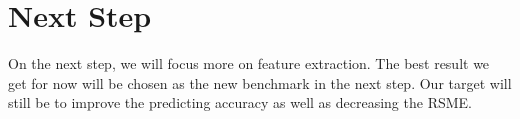\documentclass{article} %
\begin{document}

\section{Next Step}
On the next step, we will focus more on feature extraction. The best result we get for now will be chosen as the new benchmark in the next step. Our target will still be to improve the predicting accuracy as well as decreasing the RSME.
\end{document}
